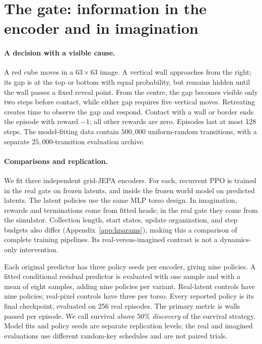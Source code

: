 \section{The gate: information in the encoder and in imagination}
\label{sec:controllers}

\paragraph{A decision with a visible cause.}
A red cube moves in a $63\times63$ image. A vertical wall approaches from the right; its gap is at
the top or bottom with equal probability, but remains hidden until the wall passes a fixed reveal
point. From the centre, the gap becomes visible only two steps before contact, while either gap
requires five vertical moves. Retreating creates time to observe the gap and respond. Contact with
a wall or border ends the episode with reward $-1$; all other rewards are zero. Episodes last at
most 128 steps. The model-fitting data contain $500{,}000$ uniform-random transitions, with a separate
$25{,}000$-transition evaluation archive.

\paragraph{Comparisons and replication.}
We fit three independent grid-JEPA encoders. For each, recurrent PPO \citep{schulman2017ppo} is trained in the real gate
on frozen latents, and inside the frozen world model on predicted latents. The latent policies use
the same MLP torso design. In imagination, rewards and terminations come from fitted heads; in the
real gate they come from the simulator. Collection length, start states, update organization, and
step budgets also differ (Appendix~\ref{app:hparams}), making this a comparison of complete training
pipelines. Its real-versus-imagined contrast is not a dynamics-only intervention.

Each original predictor has three policy seeds per encoder, giving nine policies. A fitted
conditional residual predictor is evaluated with one sample and with a mean of eight samples,
adding nine policies per variant. Real-latent controls have nine policies; real-pixel controls have
three per torso. Every reported policy is its final checkpoint, evaluated on 256 real episodes.
The primary metric is walls passed per episode. We call survival above $50\%$ \emph{discovery} of
the survival strategy. Model fits and policy seeds are separate replication levels; the real and
imagined evaluations use different random-key schedules and are not paired trials.
